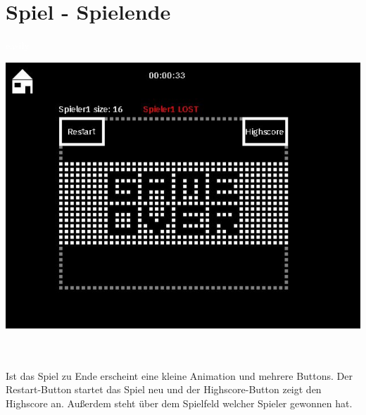 \section{Spiel - Spielende}
\label{Spiel_-_Spielende}
%
\textcolor{white}{easily}
\newline 
\begin{minipage}[X]{1.1\textwidth}
 \centering
 \includegraphics[scale=0.5]{bilder/Spielende}
 \label{fig:spielende}
\end{minipage}
\\ \\ 
	Ist das Spiel zu Ende erscheint eine kleine Animation und mehrere Buttons. Der Restart-Button startet das Spiel neu und der Highscore-Button zeigt den Highscore an. Außerdem steht über dem Spielfeld welcher Spieler gewonnen hat.  

%
